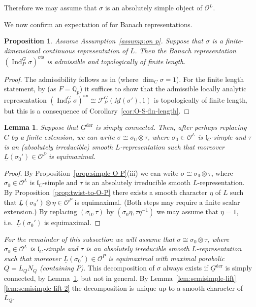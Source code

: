 \documentclass[a4paper]{amsart}
\numberwithin{equation}{section}
\newtheorem{lem}[thm]{Lemma}
\newtheorem{prop}[thm]{Proposition}
\theoremstyle{remark}
\theoremstyle{definition}
\DeclareMathOperator{\Ind}{Ind}
\newcommand{\Q}{\mathbb{Q}}
\newcommand{\alggrp}[1]{\underline{#1}}
\newcommand{\an}{\mathrm{an}}
\newcommand{\der}{\mathrm{der}}
\newcommand{\cts}{\mathrm{cts}}
\begin{document}
Therefore we may assume that $\sigma$ is an absolutely simple object of $\mathcal O^L$.

We now confirm an expectation of \cite[\S2]{MR2275644} for Banach representations.

\begin{prop}\label{prop:adm-fin-length}
  Assume Assumption~\ref{assump:on p}.
  Suppose that $\sigma$ is a finite-dimensional continuous representation of $L$.
  Then the Banach representation $(\Ind_P^G \sigma)^{\cts}$ is admissible and topologically of finite length.  
\end{prop}

\begin{proof}
  The admissibility follows as in \cite[Proposition~2.4]{MR2275644} (where $\dim_C \sigma = 1$).
  For the finite length statement,   by \cite[Theorem~7.1]{ST} (as $F = \Q_{p}$) it suffices to show that the admissible locally analytic representation $(\Ind_P^G \sigma)^{\an} \cong \mathcal{F}_P^G(\underline{M}(\sigma'),1)$ is topologically of finite length, but this is a consequence of Corollary~\ref{cor:O-S-fin-length}.
\end{proof}

\begin{lem}\label{lem:sigma0-tau-decomp}
  Suppose that $\alggrp G^\der$ is simply connected.
  Then, after perhaps replacing $C$ by a finite extension, we can write $\sigma \cong \sigma_0 \otimes \tau$, where $\sigma_0 \in \mathcal{O}^{L}$ is $\mathfrak{l}_{C}$-simple
  and $\tau$ is an (absolutely irreducible) smooth $L$-representation such that moreover $\underline{L}(\sigma_0') \in \mathcal{O}^{P}$ is equimaximal.
\end{lem}

\begin{proof}
  By Proposition~\ref{prop:simple-O-P}(iii) we can write $\sigma \cong \sigma_0 \otimes \tau$, where $\sigma_0 \in \mathcal{O}^{L}$ is $\mathfrak{l}_{C}$-simple
  and $\tau$ is an absolutely irreducible smooth $L$-representation.
  By Proposition~\ref{prop:twist-to-O-P} there exists a smooth character $\eta$ of $L$ such that $\underline{L}(\sigma_0') \otimes \eta \in \mathcal{O}^{P}$ is equimaximal.
  (Both steps may require a finite scalar extension.)
  By replacing $(\sigma_0,\tau)$ by $(\sigma_0\eta,\tau\eta^{-1})$ we may assume that $\eta = 1$, i.e.\ $\underline{L}(\sigma_0')$ is equimaximal.
\end{proof}

\emph{For the remainder of this subsection we will assume that $\sigma \cong \sigma_0 \otimes \tau$, where $\sigma_0 \in \mathcal{O}^{L}$ is $\mathfrak{l}_{C}$-simple
  and $\tau$ is an absolutely irreducible smooth $L$-representation such that moreover $\underline{L}(\sigma_0') \in \mathcal{O}^{P}$ is equimaximal with maximal parabolic $Q = L_QN_Q$ (containing $P$).}
This decomposition of $\sigma$ always exists if $\alggrp G^\der$ is simply connected, by Lemma~\ref{lem:sigma0-tau-decomp}, but not in general.
By Lemma~\ref{lem:semisimple-lift}\ref{lem:semisimple-lift-2} the decomposition is unique up to a smooth character of $L_Q$.
\end{document}
